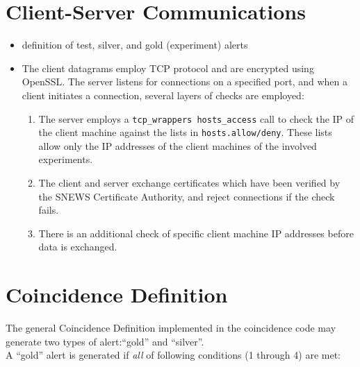 \documentclass{article}
\begin{document}
\section{Client-Server Communications}
\begin{itemize}
\item definition of test, silver, and gold (experiment) alerts
\item The client datagrams employ TCP protocol and 
are encrypted using OpenSSL.  
The server listens for connections on a specified port,
and when a client initiates a connection, several layers
of checks are employed:
\begin{enumerate}
\item The server employs a \texttt{tcp\_wrappers hosts\_access}
call to check the IP of the client machine against the lists in
\texttt{hosts.allow/deny}.  These lists allow only the IP addresses
of the client machines of the involved experiments.
\item
The client and server exchange certificates which have been
verified by the SNEWS Certificate Authority, and reject
connections if the check fails.
\item There is an additional check of specific client machine
IP addresses before data is exchanged.
\end{enumerate}
\end{itemize}

\section{Coincidence Definition}

The general Coincidence Definition implemented in the coincidence code
may generate two types of alert:``gold'' and ``silver''.\\
A ``gold'' alert is generated if \textit{all} of
following conditions (1 through 4) are met:
\end{document}
